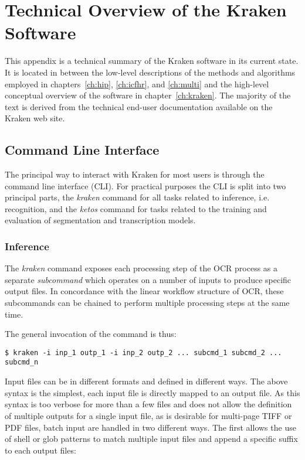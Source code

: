 \chapter{Technical Overview of the Kraken Software}
\label{app:kraken}

This appendix is a technical summary of the Kraken software in its current
state. It is located in between the low-level descriptions of the methods and
algorithms employed in chapters~\ref{ch:hip}, \ref{ch:icfhr}, and
\ref{ch:multi} and the high-level conceptual overview of the software in
chapter~\ref{ch:kraken}. The majority of the text is derived from the technical
end-user documentation available on the Kraken web site.

\section{Command Line Interface}

The principal way to interact with Kraken for most users is through the command
line interface (CLI). For practical purposes the CLI is split into two
principal parts, the \emph{kraken} command for all tasks related to inference, i.e.
recognition, and the \emph{ketos} command for tasks related to the training
and evaluation of segmentation and transcription models.

\subsection{Inference}

The \emph{kraken} command exposes each processing step of the OCR process as
a separate \emph{subcommand} which operates on a number of inputs to produce
specific output files. In concordance with the linear workflow structure of
OCR, these subcommands can be chained to perform multiple processing steps at
the same time.

The general invocation of the command is thus:

\begin{verbatim}
$ kraken -i inp_1 outp_1 -i inp_2 outp_2 ... subcmd_1 subcmd_2 ... subcmd_n
\end{verbatim}

Input files can be in different formats and defined in different ways. The
above syntax is the simplest, each input file is directly mapped to an output
file. As this syntax is too verbose for more than a few files and does not
allow the definition of multiple outputs for a single input file, as is
desirable for multi-page TIFF or PDF files, batch input are handled in two
different ways. The first allows the use of shell or glob patterns to match
multiple input files and append a specific suffix to each output files:

